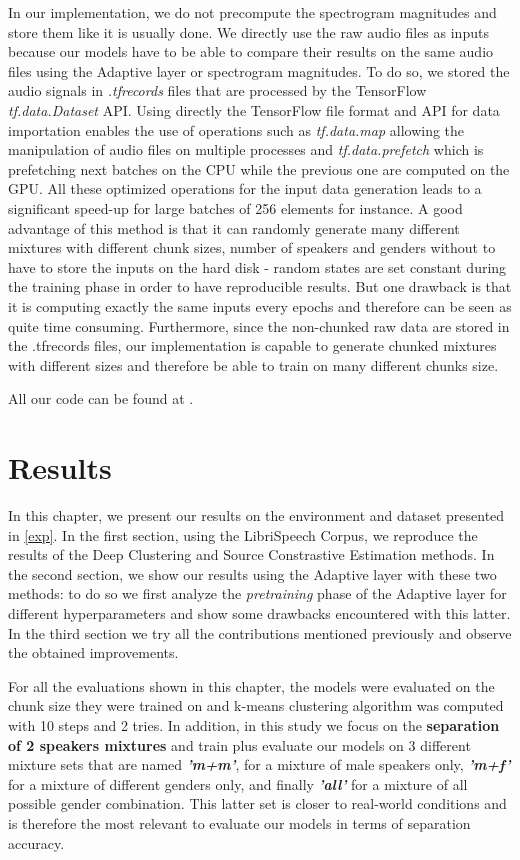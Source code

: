 \documentclass[master, tikz, final,11pt, dvipdfmx]{iscs-thesis}
\begin{document}
In our implementation, we do not precompute the spectrogram magnitudes and store them like it is usually done. We directly use the raw audio files as inputs because our models have to be able to compare their results on the same audio files using the Adaptive layer or spectrogram magnitudes. To do so, we stored the audio signals in \textit{.tfrecords} files that are processed by the TensorFlow \textit{tf.data.Dataset} API. Using directly the TensorFlow file format and API for data importation enables the use of operations such as \textit{tf.data.map} allowing the manipulation of audio files on multiple processes and \textit{tf.data.prefetch} which is prefetching next batches on the CPU while the previous one are computed on the GPU.
All these optimized operations for the input data generation leads to a significant speed-up for large batches of 256 elements for instance. A good advantage of this method is that it can randomly generate many different mixtures with different chunk sizes, number of speakers and genders without to have to store the inputs on the hard disk - random states are set constant during the training phase in order to have reproducible results. But one drawback is that it is computing exactly the same inputs every epochs and therefore can be seen as quite time consuming.
 Furthermore, since the non-chunked raw data are stored in the .tfrecords files, our implementation is capable to generate chunked mixtures with different sizes and therefore be able to train on many different chunks size. 
 
All our code can be found at \cite{github}.

\chapter{Results}
\label{res}

In this chapter, we present our results on the environment and dataset presented in \autoref{exp}.
In the first section, using the LibriSpeech Corpus, we reproduce the results of the Deep Clustering and Source Constrastive Estimation methods. In the second section, we show our results using the Adaptive layer with these two methods: to do so we first analyze the \textit{pretraining} phase of the Adaptive layer for different hyperparameters and show some drawbacks encountered with this latter. In the third section we try all the contributions mentioned previously and observe the obtained improvements.

For all the evaluations shown in this chapter, the models were evaluated on the chunk size they were trained on and k-means clustering algorithm was computed with 10 steps and 2 tries. In addition, in this study we focus on the \textbf{separation of 2 speakers mixtures} and train plus evaluate our models on 3 different mixture sets that are named \textbf{\textit{'m+m'}}, for a mixture of male speakers only, \textbf{\textit{'m+f'}} for a mixture of different genders only, and finally \textbf{\textit{'all'}} for a mixture of all possible gender combination. This latter set is closer to real-world conditions and is therefore the most relevant to evaluate our models in terms of separation accuracy.
 
\end{document}
